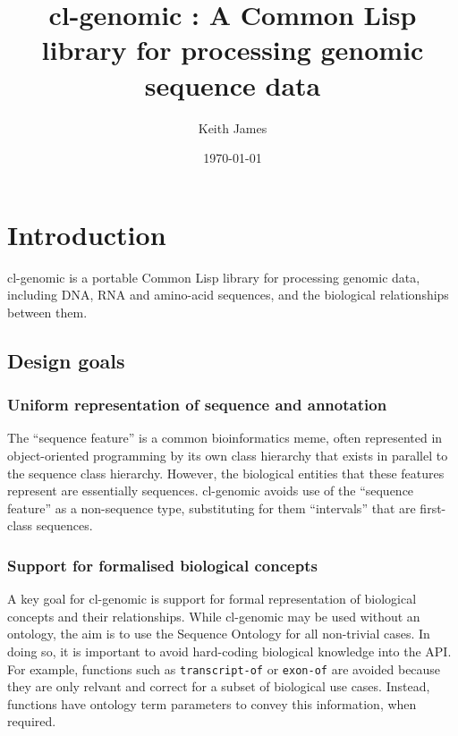 \documentclass[a4paper, 12pt]{article}
\begin{document}
\title{cl-genomic : A Common Lisp library for processing genomic
  sequence data}
\author{Keith James}
\date{\today}

\maketitle

\section{Introduction}
\label{sec:intro}

cl-genomic is a portable Common Lisp library for processing genomic
data, including DNA, RNA and amino-acid sequences, and the biological
relationships between them.

\subsection{Design goals}
\label{sec:design}

\subsubsection{Uniform representation of  sequence and annotation}
\label{sec:seqrep}

The ``sequence feature'' is a common bioinformatics meme, often
represented in object-oriented programming by its own class hierarchy
that exists in parallel to the sequence class hierarchy. However, the
biological entities that these features represent are essentially
sequences. cl-genomic avoids use of the ``sequence feature'' as a
non-sequence type, substituting for them ``intervals'' that are
first-class sequences.

\subsubsection{Support for formalised biological concepts}
\label{sec:biorel}

A key goal for cl-genomic is support for formal representation of
biological concepts and their relationships. While cl-genomic may be
used without an ontology, the aim is to use the Sequence Ontology for
all non-trivial cases. In doing so, it is important to avoid
hard-coding biological knowledge into the API. For example, functions
such as \lstinline!transcript-of! or \lstinline!exon-of! are avoided
because they are only relvant and correct for a subset of biological
use cases. Instead, functions have ontology term parameters to convey
this information, when required.
\end{document}
